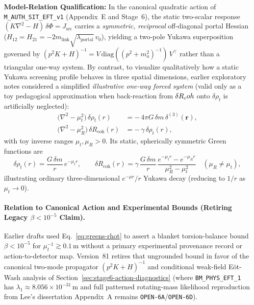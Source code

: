 \textbf{Model-Relation Qualification:} In the canonical quadratic action of \texttt{M\_AUTH\_SIT\_EFT\_v1} (Appendix~E and Stage~6), the static two-scalar response $(K\nabla^2 - H)\,\delta\Phi = J_{\mathrm{src}}$ carries a \emph{symmetric, reciprocal} off-diagonal portal Hessian ($H_{12} = H_{21} = -2 m_{\mathrm{link}}\sqrt{\lambda_{\mathrm{portal}}}\,v_0$), yielding a two-pole Yukawa superposition governed by $(p^2 K + H)^{-1} = V\,\mathrm{diag}((p^2+m_a^2)^{-1})\,V^\top$ rather than a triangular one-way system. By contrast, to visualize qualitatively how a static Yukawa screening profile behaves in three spatial dimensions, earlier exploratory notes considered a simplified \emph{illustrative one-way forced system} (valid only as a toy pedagogical approximation when back-reaction from $\delta R_coh$ onto $\delta\rho_t$ is artificially neglected):
\begin{align}
   \bigl(\nabla^2-\mu_t^2\bigr)\,\delta\rho_t(r) &= -\,4\pi G\,\delta
   m\,\delta^{(3)}(\boldsymbol{r}),\label{eq:greens-rhot}\\[4pt]
   \bigl(\nabla^2-\mu_R^2\bigr)\,\delta R_{\text{coh}}(r) &= -\,\gamma\,
   \delta\rho_t(r),\label{eq:greens-R}
\end{align}
with toy inverse ranges $\mu_t, \mu_R > 0$. Its static, spherically symmetric Green functions are
\[
   \delta\rho_t(r)=\frac{G\,\delta m}{r}\,e^{-\mu_t r},
   \qquad
   \delta R_{\text{coh}}(r)=
   \gamma\,\frac{G\,\delta m}{r}\,
   \frac{e^{-\mu_t r}-e^{-\mu_R r}}{\mu_R^2-\mu_t^2}
   \quad (\mu_R \ne \mu_t),
\]
illustrating ordinary three-dimensional $e^{-\mu r}/r$ Yukawa decay (reducing to $1/r$ as $\mu_t \to 0$).

\paragraph{Relation to Canonical Action and Experimental Bounds (Retiring Legacy $\beta < 10^{-5}$ Claim).}
Earlier drafts used Eq.~\eqref{eq:greens-rhot} to assert a blanket torsion-balance bound $\beta < 10^{-5}$ for $\mu_t^{-1} \gtrsim 0.1\,\mathrm{m}$ without a primary experimental provenance record or action-to-detector map. Version~81 retires that ungrounded bound in favor of the canonical two-mode propagator $(p^2 K + H)^{-1}$ and conditional weak-field E\"ot-Wash analysis of Section~\ref{sec:stage6-action-diagnostics} (where \texttt{BM\_PHYS\_EFT\_1} has $\lambda_1 \approx 8.056\times 10^{-31}\,\mathrm{m}$ and full patterned rotating-mass likelihood reproduction from Lee's dissertation Appendix~A remains \texttt{OPEN-6A}/\texttt{OPEN-6D}).

